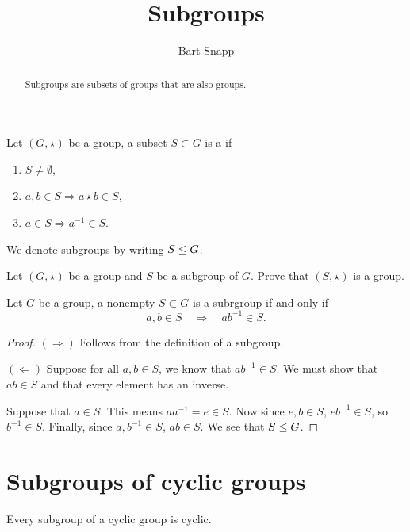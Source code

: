 \documentclass{ximera}
\author{Bart Snapp}
\title{Subgroups}
\begin{document}
\begin{abstract}
  Subgroups are subsets of groups that are also groups. 
\end{abstract}
\maketitle


\begin{definition}
  Let $(G,\star)$ be a group, a subset $S\subset G$ is a  if
  \begin{enumerate}
  \item $S \ne \emptyset$,
  \item $a,b\in S \Rightarrow a\star b\in S$,
  \item $a\in S \Rightarrow a^{-1}\in S$.
  \end{enumerate}
  We denote subgroups by writing $S\leq G$.
\end{definition}

\begin{exercise}
  Let $(G,\star)$ be a group and $S$ be a subgroup of $G$. Prove that
  $(S,\star)$ is a group.
\end{exercise}



\begin{theorem}
  Let $G$ be a group, a nonempty $S\subset G$ is a subrgroup if and
  only if
  \[
  a,b\in S \quad \Rightarrow \quad ab^{-1}\in S.
  \]
  \begin{proof}
    $(\Rightarrow)$ Follows from the definition of a subgroup.

    $(\Leftarrow)$ Suppose for all $a,b\in S$, we know that
    $ab^{-1}\in S$. We must show that $ab\in S$ and that every element
    has an inverse.

    Suppose that $a\in S$. This means $aa^{-1} = e\in S$.  Now since
    $e,b\in S$, $eb^{-1}\in S$, so $b^{-1}\in S$.  Finally, since
    $a,b^{-1}\in S$, $ab\in S$. We see that $S\leq G$.
  \end{proof}
\end{theorem}




\section{Subgroups of cyclic groups}


\begin{theorem}
  Every subgroup of a cyclic group is cyclic.
\end{theorem}
\end{document}
